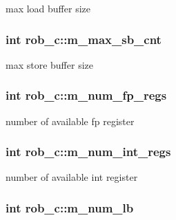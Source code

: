 max load buffer size \hypertarget{classrob__c_a7026c11d9809e91c2d9455015e8818b4}{
\subsubsection[{m\_\-max\_\-sb\_\-cnt}]{\setlength{\rightskip}{0pt plus 5cm}int {\bf rob\_\-c::m\_\-max\_\-sb\_\-cnt}}}
\label{classrob__c_a7026c11d9809e91c2d9455015e8818b4}
max store buffer size \hypertarget{classrob__c_a0fd2dd4e3783114c2d2d5fad5c40d480}{
\subsubsection[{m\_\-num\_\-fp\_\-regs}]{\setlength{\rightskip}{0pt plus 5cm}int {\bf rob\_\-c::m\_\-num\_\-fp\_\-regs}}}
\label{classrob__c_a0fd2dd4e3783114c2d2d5fad5c40d480}
number of available fp register \hypertarget{classrob__c_a5ca3ef95e9d8ba4bc517c6ecbb3a628a}{
\subsubsection[{m\_\-num\_\-int\_\-regs}]{\setlength{\rightskip}{0pt plus 5cm}int {\bf rob\_\-c::m\_\-num\_\-int\_\-regs}}}
\label{classrob__c_a5ca3ef95e9d8ba4bc517c6ecbb3a628a}
number of available int register \hypertarget{classrob__c_af164e55237aee6fd38c06baf8e4079c5}{
\subsubsection[{m\_\-num\_\-lb}]{\setlength{\rightskip}{0pt plus 5cm}int {\bf rob\_\-c::m\_\-num\_\-lb}}}
\label{classrob__c_af164e55237aee6fd38c06baf8e4079c5}
